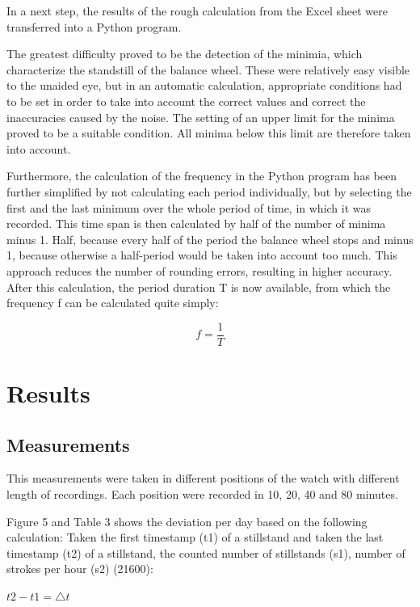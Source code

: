\documentclass[12pt, a4paper]{report}
\begin{document}
    In a next step, the results of the rough calculation from the Excel sheet were transferred into a Python program. 
    
    The greatest difficulty proved to be the detection of the minimia, which characterize the standstill of the balance wheel. These were relatively easy visible to the unaided eye, but in an automatic calculation, appropriate conditions had to be set in order to take into account the correct values and correct the inaccuracies caused by the noise. The setting of an upper limit for the minima proved to be a suitable condition. All minima below this limit are therefore taken into account. 
    
    Furthermore, the calculation of the frequency in the Python program has been further simplified by not calculating each period individually, but by selecting the first and the last minimum over the whole period of time, in which it was recorded. This time span is then calculated by half of the number of minima minus 1. Half, because every half of the period the balance wheel stops and minus 1, because otherwise a half-period would be taken into account too much. This approach reduces the number of rounding errors, resulting in higher accuracy. After this calculation, the period duration T is now available, from which the frequency f can be calculated quite simply: 
    
     \begin{displaymath}
      f = \frac{1}{T}
     \end{displaymath}
    
    \chapter{Results}
    
    \section{Measurements}
    This measurements were taken in different positions of the watch with different length
    of recordings. Each position were recorded in 10, 20, 40 and 80 minutes.
    
    Figure 5 and Table 3 shows the deviation per day based on the following calculation:
    Taken the first timestamp (t1) of a stillstand and taken the last timestamp (t2) of a stillstand, the counted
    number of stillstands (s1), number of strokes per hour (s2) (21600):
    \bigskip
    
    \(t2-t1 = \triangle t\)
    
\end{document}
